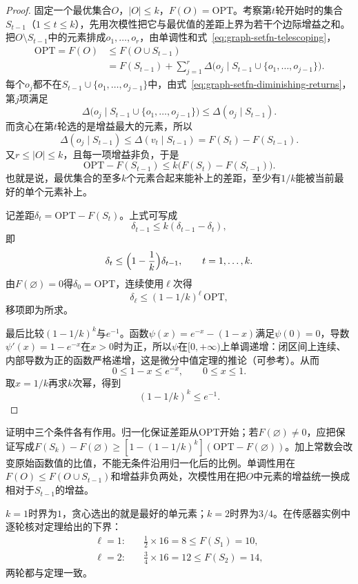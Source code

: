 \begin{proof}
固定一个最优集合$O$，$|O|\leq k$，$F(O)=\mathrm{OPT}$。考察第$t$轮开始时的集合$S_{t-1}$（$1\leq t\leq k$），先用次模性把它与最优值的差距上界为若干个边际增益之和。把$O\setminus S_{t-1}$中的元素排成$o_1,\ldots,o_r$，由单调性和式~\eqref{eq:graph-setfn-telescoping}，
\[
  \begin{aligned}
  \mathrm{OPT}=F(O)&\leq F(O\cup S_{t-1})\\
  &=F(S_{t-1})+\sum_{j=1}^{r}\Delta\bigl(o_j\mid S_{t-1}\cup\{o_1,\ldots,o_{j-1}\}\bigr).
  \end{aligned}
\]
每个$o_j$都不在$S_{t-1}\cup\{o_1,\ldots,o_{j-1}\}$中，由式~\eqref{eq:graph-setfn-diminishing-returns}，第$j$项满足
\[
  \Delta\bigl(o_j\mid S_{t-1}\cup\{o_1,\ldots,o_{j-1}\}\bigr)\leq\Delta(o_j\mid S_{t-1}).
\]
而贪心在第$t$轮选的是增益最大的元素，所以
\[
  \Delta(o_j\mid S_{t-1})\leq\Delta(v_t\mid S_{t-1})=F(S_t)-F(S_{t-1}).
\]
又$r\leq|O|\leq k$，且每一项增益非负，于是
\[
  \mathrm{OPT}-F(S_{t-1})\leq k\bigl(F(S_t)-F(S_{t-1})\bigr).
\]
也就是说，最优集合的至多$k$个元素合起来能补上的差距，至少有$1/k$能被当前最好的单个元素补上。

记差距$\delta_t=\mathrm{OPT}-F(S_t)$。上式可写成
\[
  \delta_{t-1}\leq k(\delta_{t-1}-\delta_t),
\]
即
\[
  \delta_t\leq\Bigl(1-\frac1k\Bigr)\delta_{t-1},\qquad t=1,\ldots,k.
\]
由$F(\varnothing)=0$得$\delta_0=\mathrm{OPT}$，连续使用$\ell$次得
\[
  \delta_\ell\leq(1-1/k)^\ell\,\mathrm{OPT},
\]
移项即为所求。

最后比较$(1-1/k)^k$与$e^{-1}$。函数$\psi(x)=e^{-x}-(1-x)$满足$\psi(0)=0$，导数$\psi'(x)=1-e^{-x}$在$x>0$时为正，所以$\psi$在$[0,+\infty)$上单调递增：闭区间上连续、内部导数为正的函数严格递增，这是微分中值定理的推论（可参考）。从而
\[
  0\leq1-x\leq e^{-x},\qquad 0\leq x\leq1.
\]
取$x=1/k$再求$k$次幂，得到
\[
  (1-1/k)^k\leq e^{-1}.
\]
\end{proof}

证明中三个条件各有作用。归一化保证差距从$\mathrm{OPT}$开始；若$F(\varnothing)\neq0$，应把保证写成$F(S_k)-F(\varnothing)\geq[1-(1-1/k)^k](\mathrm{OPT}-F(\varnothing))$。加上常数会改变原始函数值的比值，不能无条件沿用归一化后的比例。单调性用在$F(O)\leq F(O\cup S_{t-1})$和增益非负两处，次模性用在把$O$中元素的增益统一换成相对于$S_{t-1}$的增益。

$k=1$时界为$1$，贪心选出的就是最好的单元素；$k=2$时界为$3/4$。在传感器实例中逐轮核对定理给出的下界：
\[
  \begin{aligned}
  \ell=1:&\quad \tfrac12\times16=8\leq F(S_1)=10,\\
  \ell=2:&\quad \tfrac34\times16=12\leq F(S_2)=14,
  \end{aligned}
\]
两轮都与定理一致。

